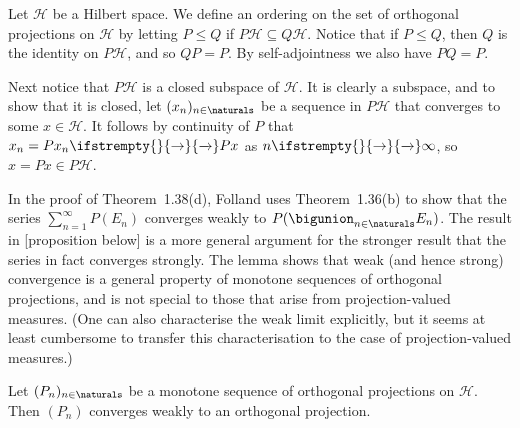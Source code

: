 \documentclass[article, a4paper, 11pt, oneside]{memoir}
\numberwithin{equation}{chapter}
\newcommand{\calH}{\mathcal{H}}
\renewcommand\to[1][]{%
    \ifstrempty{#1}{%
        \rightarrow
    }{%
        \xrightarrow[#1]{}
    }%
}
\begin{document}
\begin{remark}
    Let $\calH$ be a Hilbert space. We define an ordering on the set of orthogonal projections on $\calH$ by letting $P \leq Q$ if $P\calH \subseteq Q\calH$. Notice that if $P \leq Q$, then $Q$ is the identity on $P\calH$, and so $QP = P$. By self-adjointness we also have $PQ = P$.

    Next notice that $P\calH$ is a closed subspace of $\calH$. It is clearly a subspace, and to show that it is closed, let $(x_n)_{n\in\naturals}$ be a sequence in $P\calH$ that converges to some $x \in \calH$. It follows by continuity of $P$ that $x_n = Px_n \to Px$ as $n \to \infty$, so $x = Px \in P\calH$.

    In the proof of Theorem~1.38(d), Folland uses Theorem~1.36(b) to show that the series $\sum_{n=1}^\infty P(E_n)$ converges weakly to $P(\bigunion_{n\in\naturals} E_n)$. The result in [proposition below] is a more general argument for the stronger result that the series in fact converges strongly. The lemma shows that weak (and hence strong) convergence is a general property of monotone sequences of orthogonal projections, and is not special to those that arise from projection-valued measures. (One can also characterise the weak limit explicitly, but it seems at least cumbersome to transfer this characterisation to the case of projection-valued measures.)
\end{remark}

\begin{lemma}
    Let $(P_n)_{n\in\naturals}$ be a monotone sequence of orthogonal projections on $\calH$. Then $(P_n)$ converges weakly to an orthogonal projection.
\end{lemma}
\end{document}
